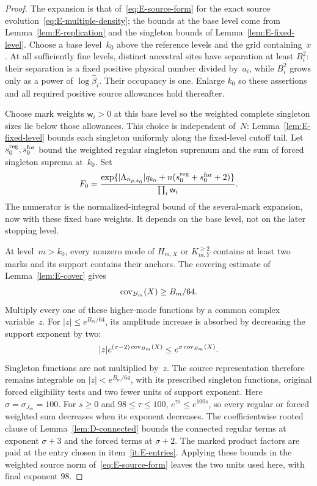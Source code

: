\begin{proof}
The expansion is that of~\eqref{eq:E-source-form} for the exact source evolution~\eqref{eq:E-multiple-density}; the bounds at the base level come from Lemma~\ref{lem:E-replication} and the singleton bounds of Lemma~\ref{lem:E-fixed-level}. Choose a base level~$k_0$ above the reference levels and the grid containing~$x$. At all sufficiently fine levels, distinct ancestral sites have separation at least $B_i^2$: their separation is a fixed positive physical number divided by~$a_i$, while $B_i^2$ grows only as a power of $\log\widehat\beta_i$. Their occupancy is one. Enlarge $k_0$ so these assertions and all required positive source allowances hold thereafter.

Choose mark weights $\mathsf w_i>0$ at this base level so the weighted complete singleton sizes lie below those allowances. This choice is independent of~$N$: Lemma~\ref{lem:E-fixed-level} bounds each singleton uniformly along the fixed-level cutoff tail. Let $s_0^{\rm reg},s_0^{\rm for}$ bound the weighted regular singleton supremum and the sum of forced singleton suprema at~$k_0$. Set
\begin{equation}\label{eq:E-stopping-constant}
 F_0=\frac{\exp\{|\Lambda_{n_{p,k_0}}|q_{k_0}
                      +n(s_0^{\rm reg}+s_0^{\rm for}+2)\}}{\prod_i\mathsf w_i}.
\end{equation}
The numerator is the normalized-integral bound of the several-mark expansion, now with these fixed base weights. It depends on the base level, not on the later stopping level.

At level~$m>k_0$, every nonzero mode of $H_{m,X}$ or $K^{\ge2}_{m,Y}$ contains at least two marks and its support contains their anchors. The covering estimate of Lemma~\ref{lem:E-cover} gives
\begin{equation*}
 \operatorname{cov}_{B_m}(X)\ge B_m/64.
\end{equation*}
Multiply every one of these higher-mode functions by a common complex variable~$z$. For $|z|\le e^{B_m/64}$, its amplitude increase is absorbed by decreasing the support exponent by two:
\begin{equation*}
 |z|e^{(\sigma-2)\operatorname{cov}_{B_m}(X)}
 \le e^{\sigma\operatorname{cov}_{B_m}(X)}.
\end{equation*}
Singleton functions are not multiplied by~$z$. The source representation therefore remains integrable on $|z|<e^{B_m/64}$, with its prescribed singleton functions, original forced eligibility tests and two fewer units of support exponent. Here $\sigma=\sigma_{J_m}=100$. For $s\ge0$ and $98\le\tau\le100$, $e^{\tau s}\le e^{100s}$, so every regular or forced weighted sum decreases when its exponent decreases. The coefficientwise rooted clause of Lemma~\ref{lem:D-connected} bounds the connected regular terms at exponent $\sigma+3$ and the forced terms at $\sigma+2$. The marked product factors are paid at the entry chosen in item~\ref{it:E-entries}. Applying these bounds in the weighted source norm of~\eqref{eq:E-source-form} leaves the two units used here, with final exponent $98$.


\end{proof}
